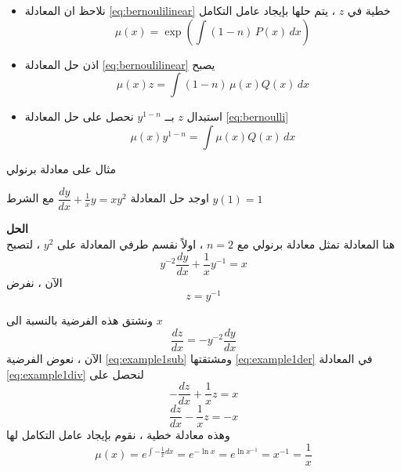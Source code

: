 		\begin{frame}
			\begin{itemize}
				\item نلاحظ ان المعادلة \eqref{eq:bernoulilinear} خطية في $z$ ، يتم حلها بإيجاد عامل التكامل
				\[
				\mu(x) = \exp\left(\int (1-n)\, P(x) \, dx\right)
				\]
				\item اذن حل المعادلة \eqref{eq:bernoulilinear} يصبح
				\[
				\mu(x) z = \int (1-n)\, \mu(x) Q(x) \, dx
				\]
				\item استبدال $z$ بــ $y^{1-n}$ نحصل على حل المعادلة \eqref{eq:bernoulli}
				\[
				\mu(x) y^{1-n} = \int \mu(x) Q(x)\, dx
				\]
			\end{itemize}
		\end{frame}
		\setcounter{equation}{0}
		\begin{frame}{مثال على معادلة برنولي}
			\begin{example}
				اوجد حل المعادلة 
				$
				\dfrac{dy}{dx} + \frac{1}{x} y = xy^2
				$
				مع الشرط $y(1) = 1 $
			\end{example}
			\textbf{الحل}\\
				هنا المعادلة تمثل معادلة برنولي مع $n=2 $ ، اولاً نقسم طرفي المعادلة على $y^2 $ ، لتصبح
				\begin{equation}
					\label{eq:example1div}
					y^{-2} \frac{dy}{dx} + \frac{1}{x} y^{-1} = x
				\end{equation}
				الآن ، نفرض
				\begin{equation}
					\label{eq:example1sub}
					z=y^{-1}
				\end{equation}
		\end{frame}
		\begin{frame}
			
			ونشتق هذه الفرضية بالنسبة الى $x$
			\begin{equation}
				\label{eq:example1der}
				\frac{dz}{dx} =  -y^{-2} \frac{dy}{dx}
			\end{equation}
			الآن ، نعوض الفرضية \eqref{eq:example1sub} ومشتقتها \eqref{eq:example1der} في المعادلة \eqref{eq:example1div} لنحصل على 
			\[
			-\frac{dz}{dx} + \frac{1}{x} z =x
			\]
			\begin{equation}
				\label{eq:example1linear}
				\frac{dz}{dx} - \frac{1}{x} z = -x
			\end{equation}
			وهذه معادلة خطية ، نقوم بإيجاد عامل التكامل لها
			\[
			\mu(x) = e^{\int -\frac{1}{x} dx} = e^{-\ln x} = e^{\ln x^{-1}} = x^{-1} = \frac{1}{x}
			\]
		\end{frame}
		
